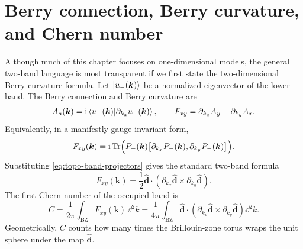 \section{Berry connection, Berry curvature, and Chern number}
\label{sec:topo-berry-curvature-chern}

Although much of this chapter focuses on one-dimensional models, the general
two-band language is most transparent if we first state the two-dimensional
Berry-curvature formula.  Let $\left|u_-(\bm k)\right\rangle$ be a normalized eigenvector of
the lower band.  The Berry connection and Berry curvature are
\begin{equation}
\label{eq:topo-berry-connection-curvature}
    A_a(\bm k)=\mathrm{i}\left\langle u_-(\bm k)\middle|\partial_{k_a}u_-(\bm k)\right\rangle,
    \qquad
    F_{xy}=\partial_{k_x}A_y-\partial_{k_y}A_x .
\end{equation}
Equivalently, in a manifestly gauge-invariant form,
\begin{equation}
\label{eq:topo-projector-curvature}
    F_{xy}(\bm k)
    =
    \mathrm{i}\operatorname{Tr}\Bigl(P_-(\bm k)\bigl[\partial_{k_x}P_-(\bm k),
    \partial_{k_y}P_-(\bm k)\bigr]\Bigr).
\end{equation}
Substituting \cref{eq:topo-band-projectors} gives the standard two-band formula
\begin{equation}
\label{eq:topo-two-band-berry-curvature}
    F_{xy}(\bm k)
    =
    \frac12\widehat{\bm d}\cdot
    \left(
        \partial_{k_x}\widehat{\bm d}
        \times
        \partial_{k_y}\widehat{\bm d}
    \right).
\end{equation}
The first Chern number of the occupied band is
\begin{equation}
\label{eq:topo-chern-number}
    C
    =
    \frac{1}{2\pi}\int_{\mathrm{BZ}} F_{xy}(\bm k)\,\dd^2k
    =
    \frac{1}{4\pi}\int_{\mathrm{BZ}}
    \widehat{\bm d}\cdot
    \left(
        \partial_{k_x}\widehat{\bm d}
        \times
        \partial_{k_y}\widehat{\bm d}
    \right)\dd^2k .
\end{equation}
Geometrically, $C$ counts how many times the Brillouin-zone torus wraps the unit
sphere under the map $\widehat{\bm d}$.

